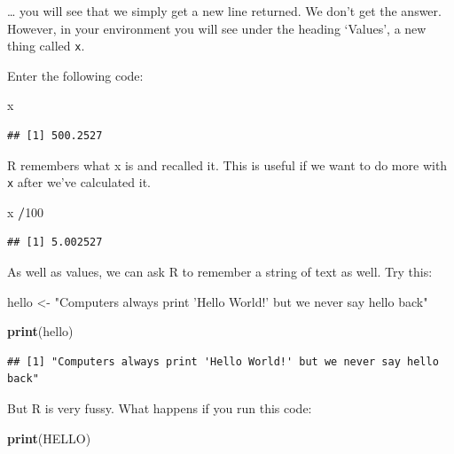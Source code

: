 \documentclass[
]{book}
\newenvironment{Shaded}{\begin{snugshade}}{\end{snugshade}}
\newcommand{\DecValTok}[1]{\textcolor[rgb]{0.00,0.00,0.81}{#1}}
\newcommand{\KeywordTok}[1]{\textcolor[rgb]{0.13,0.29,0.53}{\textbf{#1}}}
\newcommand{\NormalTok}[1]{#1}
\newcommand{\OperatorTok}[1]{\textcolor[rgb]{0.81,0.36,0.00}{\textbf{#1}}}
\newcommand{\StringTok}[1]{\textcolor[rgb]{0.31,0.60,0.02}{#1}}
\begin{document}
\ldots{} you will see that we simply get a new line returned. We don't get the answer. However, in your environment you will see under the heading `Values', a new thing called \texttt{x}.

Enter the following code:

\begin{Shaded}
\begin{Highlighting}[]
\NormalTok{x}
\end{Highlighting}
\end{Shaded}

\begin{verbatim}
## [1] 500.2527
\end{verbatim}

R remembers what x is and recalled it. This is useful if we want to do more with \texttt{x} after we've calculated it.

\begin{Shaded}
\begin{Highlighting}[]
\NormalTok{x }\OperatorTok{/}\DecValTok{100}
\end{Highlighting}
\end{Shaded}

\begin{verbatim}
## [1] 5.002527
\end{verbatim}

As well as values, we can ask R to remember a string of text as well. Try this:

\begin{Shaded}
\begin{Highlighting}[]
\NormalTok{hello <-}\StringTok{ "Computers always print 'Hello World!' but we never say hello back"}


\KeywordTok{print}\NormalTok{(hello)}
\end{Highlighting}
\end{Shaded}

\begin{verbatim}
## [1] "Computers always print 'Hello World!' but we never say hello back"
\end{verbatim}

But R is very fussy. What happens if you run this code:

\begin{Shaded}
\begin{Highlighting}[]
\KeywordTok{print}\NormalTok{(HELLO)}
\end{Highlighting}
\end{Shaded}
\end{document}
